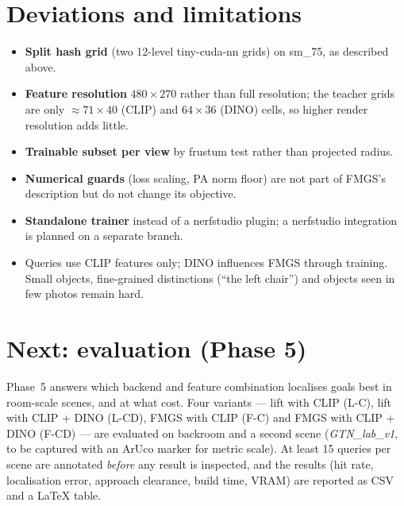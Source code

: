 \documentclass[11pt,a4paper]{article}
\begin{document}
\section{Deviations and limitations}
\begin{itemize}
  \item \textbf{Split hash grid} (two 12-level tiny-cuda-nn grids) on sm\_75, as described above.
  \item \textbf{Feature resolution} $480\times270$ rather than full resolution; the teacher grids are only
        $\approx71\times40$ (CLIP) and $64\times36$ (DINO) cells, so higher render resolution adds little.
  \item \textbf{Trainable subset per view} by frustum test rather than projected radius.
  \item \textbf{Numerical guards} (loss scaling, PA norm floor) are not part of FMGS's description but do not
        change its objective.
  \item \textbf{Standalone trainer} instead of a nerfstudio plugin; a nerfstudio integration is planned on a
        separate branch.
  \item Queries use CLIP features only; DINO influences FMGS through training. Small objects, fine-grained
        distinctions (``the left chair'') and objects seen in few photos remain hard.
\end{itemize}

\section{Next: evaluation (Phase 5)}
Phase~5 answers which backend and feature combination localises goals best in room-scale scenes, and at what cost.
Four variants --- lift with CLIP (L-C), lift with CLIP + DINO (L-CD), FMGS with CLIP (F-C) and FMGS with CLIP + DINO
(F-CD) --- are evaluated on backroom and a second scene (\emph{GTN\_lab\_v1}, to be captured with an ArUco marker
for metric scale). At least 15 queries per scene are annotated \emph{before} any result is inspected, and the
results (hit rate, localisation error, approach clearance, build time, VRAM) are reported as CSV and a LaTeX table.
\end{document}
